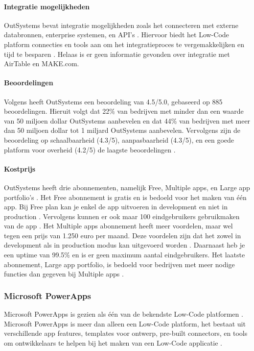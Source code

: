 \paragraph{Integratie mogelijkheden}
OutSystems bevat integratie mogelijkheden zoals het connecteren met externe databronnen, enterprise systemen, en API's \autocite{Payne2023}.
Hiervoor biedt het Low-Code platform connecties en tools aan om het integratieproces te vergemakkelijken en tijd te besparen \autocite{Payne2023}. Helaas
is er geen informatie gevonden over integratie met AirTable en MAKE.com.

\paragraph{Beoordelingen}
Volgens \textcite{Gartner2024} heeft OutSystems een beoordeling van 4.5/5.0, gebaseerd op 885 beoordelingen. 
Hieruit volgt dat 22\% van bedrijven met minder dan een waarde van 50 miljoen dollar OutSystems aanbevelen en dat 44\% van bedrijven met meer dan 50 miljoen dollar tot 1 miljard OutSystems aanbevelen.
Vervolgens zijn de beoordeling op schaalbaarheid (4.3/5), aanpasbaarheid (4.3/5), en een goede platform voor overheid (4.2/5) de laagste beoordelingen \autocite{Gartner2024}.

\paragraph{Kostprijs}
OutSystems heeft drie abonnementen, namelijk Free, Multiple apps, en Large app portfolio's \autocite{OutSystems}. Het Free abonnement is gratis en is bedoeld voor het maken van één app.
Bij Free plan kan je enkel de app uitvoeren in development en niet in production \autocite{OutSystems}. Vervolgens kunnen er ook maar 100 eindgebruikers gebruikmaken van de app \autocite{OutSystems}.
Het Multiple apps abonnement heeft meer voordelen, maar wel tegen een prijs van 1.250 euro per maand. Deze voordelen zijn dat het zowel in development als in production modus kan uitgevoerd worden \autocite{OutSystems}.
Daarnaast heb je een uptime van 99.5\% en is er geen maximum aantal eindgebruikers. Het laatste abonnement, Large app portfolio, is bedoeld voor bedrijven met meer nodige functies dan gegeven bij Multiple apps \autocite{OutSystems}. 
\subsubsection*{Microsoft PowerApps}
Microsoft PowerApps is gezien als één van de bekendste Low-Code platformen \autocite{Nguyen} \autocite{Gupta2023}.
Microsoft PowerApps is meer dan alleen een Low-Code platform, het bestaat uit verschillende app features, templates voor ontwerp, pre-built connectors, en tools om ontwikkelaars te helpen bij het maken van een Low-Code applicatie \autocite{Nguyen}.

